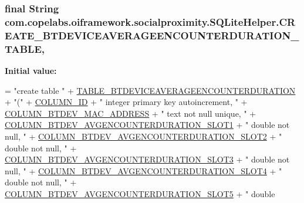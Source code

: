 \subsubsection[{C\+R\+E\+A\+T\+E\+\_\+\+B\+T\+D\+E\+V\+I\+C\+E\+A\+V\+E\+R\+A\+G\+E\+E\+N\+C\+O\+U\+N\+T\+E\+R\+D\+U\+R\+A\+T\+I\+O\+N\+\_\+\+T\+A\+B\+L\+E}]{\setlength{\rightskip}{0pt plus 5cm}final String com.\+copelabs.\+oiframework.\+socialproximity.\+S\+Q\+Lite\+Helper.\+C\+R\+E\+A\+T\+E\+\_\+\+B\+T\+D\+E\+V\+I\+C\+E\+A\+V\+E\+R\+A\+G\+E\+E\+N\+C\+O\+U\+N\+T\+E\+R\+D\+U\+R\+A\+T\+I\+O\+N\+\_\+\+T\+A\+B\+L\+E\hspace{0.3cm}{\ttfamily [static]}, {\ttfamily [private]}}\label{classcom_1_1copelabs_1_1oiframework_1_1socialproximity_1_1_s_q_lite_helper_a7c3a3362d1860f645cee13b28ddccee3}
{\bfseries Initial value\+:}
\begin{DoxyCode}
= \textcolor{stringliteral}{"create table "}
              + \hyperlink{classcom_1_1copelabs_1_1oiframework_1_1socialproximity_1_1_s_q_lite_helper_acfb9d1512f69c1299ca39bf979ae7911}{TABLE\_BTDEVICEAVERAGEENCOUNTERDURATION} + \textcolor{stringliteral}{"("}
              + \hyperlink{classcom_1_1copelabs_1_1oiframework_1_1socialproximity_1_1_s_q_lite_helper_a42da605a2e3ade18adf5dd701eb48b06}{COLUMN\_ID} + \textcolor{stringliteral}{" integer primary key autoincrement, "}
              + \hyperlink{classcom_1_1copelabs_1_1oiframework_1_1socialproximity_1_1_s_q_lite_helper_aa664c2d0219f93cc556b30e4b48954c1}{COLUMN\_BTDEV\_MAC\_ADDRESS} + \textcolor{stringliteral}{" text not null unique, "}
              + \hyperlink{classcom_1_1copelabs_1_1oiframework_1_1socialproximity_1_1_s_q_lite_helper_a1587f0eed87daf373cf8e595fa3061a0}{COLUMN\_BTDEV\_AVGENCOUNTERDURATION\_SLOT1} + \textcolor{stringliteral}{" double
       not null, "}
              + \hyperlink{classcom_1_1copelabs_1_1oiframework_1_1socialproximity_1_1_s_q_lite_helper_aefeb1d706536288b9e0e606fe4ee6df1}{COLUMN\_BTDEV\_AVGENCOUNTERDURATION\_SLOT2} + \textcolor{stringliteral}{" double
       not null, "}
              + \hyperlink{classcom_1_1copelabs_1_1oiframework_1_1socialproximity_1_1_s_q_lite_helper_a4f1f938f3722be2271d4593b1d8d3ac2}{COLUMN\_BTDEV\_AVGENCOUNTERDURATION\_SLOT3} + \textcolor{stringliteral}{" double
       not null, "}
              + \hyperlink{classcom_1_1copelabs_1_1oiframework_1_1socialproximity_1_1_s_q_lite_helper_aa7f5e3c448045c6ea284cead8ada6280}{COLUMN\_BTDEV\_AVGENCOUNTERDURATION\_SLOT4} + \textcolor{stringliteral}{" double
       not null, "}
              + \hyperlink{classcom_1_1copelabs_1_1oiframework_1_1socialproximity_1_1_s_q_lite_helper_a7d44e66e42425d636c452b9dbddec5db}{COLUMN\_BTDEV\_AVGENCOUNTERDURATION\_SLOT5} + \textcolor{stringliteral}{" double
}
\end{DoxyCode}
